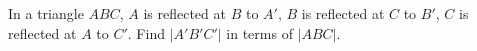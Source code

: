 In a triangle $ABC$, $A$ is reflected at $B$ to $A'$, $B$ is reflected at $C$ to $B'$, $C$ is reflected at $A$ to $C'$. Find $|A'B'C'|$ in terms of $|ABC|$.
